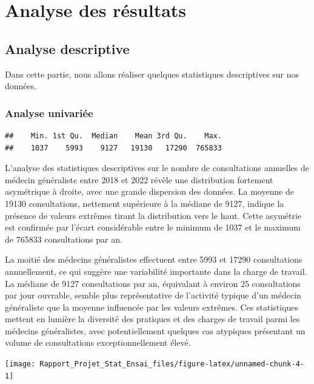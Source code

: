 \documentclass[
]{article}
\begin{document}
\section{Analyse des résultats}\label{analyse-des-ruxe9sultats}

\subsection{Analyse descriptive}\label{analyse-descriptive}

Dans cette partie, nous allons réaliser quelques statistiques
descriptives sur nos données.

\subsubsection{Analyse univariée}\label{analyse-univariuxe9e}

\begin{verbatim}
##    Min. 1st Qu.  Median    Mean 3rd Qu.    Max. 
##    1037    5993    9127   19130   17290  765833
\end{verbatim}

L'analyse des statistiques descriptives sur le nombre de consultations
annuelles de médecin généraliste entre 2018 et 2022 révèle une
distribution fortement asymétrique à droite, avec une grande dispersion
des données. La moyenne de 19130 consultations, nettement supérieure à
la médiane de 9127, indique la présence de valeurs extrêmes tirant la
distribution vers le haut. Cette asymétrie est confirmée par l'écart
considérable entre le minimum de 1037 et le maximum de 765833
consultations par an.

La moitié des médecins généralistes effectuent entre 5993 et 17290
consultations annuellement, ce qui suggère une variabilité importante
dans la charge de travail. La médiane de 9127 consultations par an,
équivalant à environ 25 consultations par jour ouvrable, semble plus
représentative de l'activité typique d'un médecin généraliste que la
moyenne influencée par les valeurs extrêmes. Ces statistiques mettent en
lumière la diversité des pratiques et des charges de travail parmi les
médecins généralistes, avec potentiellement quelques cas atypiques
présentant un volume de consultations exceptionnellement élevé.

\begin{center}\texttt{[image: Rapport\_Projet\_Stat\_Ensai\_files/figure-latex/unnamed-chunk-4-1]} \end{center}
\end{document}
